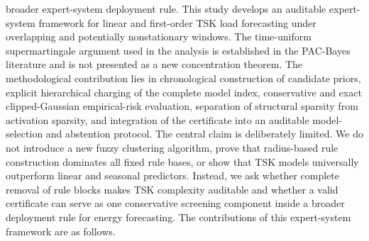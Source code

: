 broader expert-system deployment rule.
This study develops an auditable expert-system framework for linear and first-order
TSK load forecasting under overlapping and potentially nonstationary windows. The
time-uniform supermartingale argument used in the analysis is established in the
PAC-Bayes literature and is not presented as a new concentration theorem. The
methodological contribution lies in chronological construction of candidate priors,
explicit hierarchical charging of the complete model index, conservative and exact
clipped-Gaussian empirical-risk evaluation, separation of structural sparsity from
activation sparsity, and integration of the certificate into an auditable
model-selection and abstention protocol.
The central claim is deliberately limited. We do not introduce a new fuzzy
clustering algorithm, prove that radius-based rule construction dominates all fixed
rule bases, or show that TSK models universally outperform linear and seasonal
predictors. Instead, we ask whether complete removal of rule blocks makes TSK
complexity auditable and whether a valid certificate can serve as one conservative
screening component inside a broader deployment rule for energy forecasting.
The contributions of this expert-system framework are as follows.
